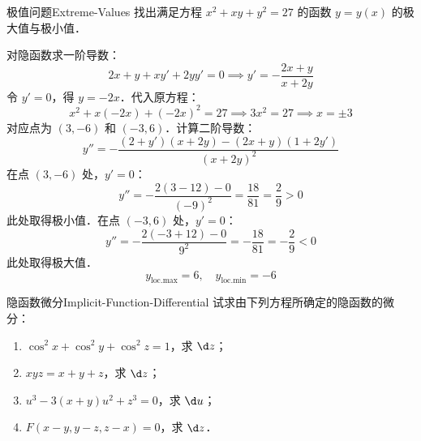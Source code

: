 \begin{problem}{极值问题}{Extreme-Values}
    找出满足方程 $x^2 + xy + y^2 = 27$ 的函数 $y = y(x)$ 的极大值与极小值．
\end{problem}

\begin{solution}
    对隐函数求一阶导数：
    \begin{equation}
        2x + y + x y' + 2y y' = 0 \implies y' = -\frac{2x + y}{x + 2y}
    \end{equation}
    令 $y' = 0$，得 $y = -2x$．代入原方程：
    \begin{equation}
        x^2 + x(-2x) + (-2x)^2 = 27 \implies 3x^2 = 27 \implies x = \pm 3
    \end{equation}
    对应点为 $(3, -6)$ 和 $(-3, 6)$．计算二阶导数：
    \begin{equation}
        y'' = -\frac{(2+y')(x+2y) - (2x+y)(1+2y')}{(x+2y)^2}
    \end{equation}
    在点 $(3, -6)$ 处，$y' = 0$：
    \begin{equation}
        y'' = -\frac{2(3 - 12) - 0}{(-9)^2} = \frac{18}{81} = \frac{2}{9} > 0
    \end{equation}
    此处取得极小值．在点 $(-3, 6)$ 处，$y' = 0$：
    \begin{equation}
        y'' = -\frac{2(-3 + 12) - 0}{9^2} = -\frac{18}{81} = -\frac{2}{9} < 0
    \end{equation}
    此处取得极大值．
    \begin{equation}
        \boxed{y_{\text{loc.max}} = 6, \quad y_{\text{loc.min}} = -6}
    \end{equation}
\end{solution}


\begin{problem}{隐函数微分}{Implicit-Function-Differential}
    试求由下列方程所确定的隐函数的微分：
    \begin{enumerate}
        \item $\cos^2 x + \cos^2 y + \cos^2 z = 1$，求 $\d z$；
        \item $xyz = x + y + z$，求 $\d z$；
        \item $u^3 - 3(x + y)u^2 + z^3 = 0$，求 $\d u$；
        \item $F(x - y, y - z, z - x) = 0$，求 $\d z$．
    \end{enumerate}
\end{problem}

